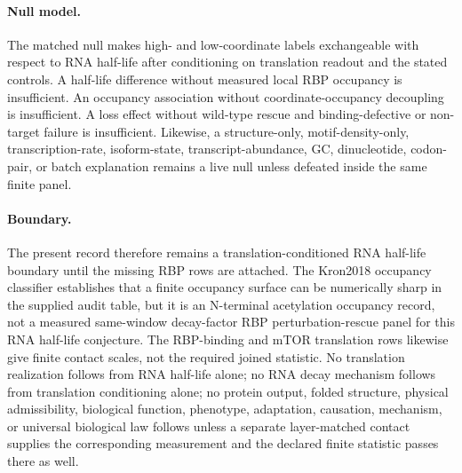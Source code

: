\paragraph{Null model.}
The matched null makes high- and low-coordinate labels exchangeable with respect to RNA half-life after conditioning on translation readout and the stated controls.  A half-life difference without measured local RBP occupancy is insufficient.  An occupancy association without coordinate-occupancy decoupling is insufficient.  A loss effect without wild-type rescue and binding-defective or non-target failure is insufficient.  Likewise, a structure-only, motif-density-only, transcription-rate, isoform-state, transcript-abundance, GC, dinucleotide, codon-pair, or batch explanation remains a live null unless defeated inside the same finite panel.

\paragraph{Boundary.}
The present record therefore remains a translation-conditioned RNA half-life boundary until the missing RBP rows are attached.  The Kron2018 occupancy classifier establishes that a finite occupancy surface can be numerically sharp in the supplied audit table, but it is an N-terminal acetylation occupancy record, not a measured same-window decay-factor RBP perturbation-rescue panel for this RNA half-life conjecture.  The RBP-binding and mTOR translation rows likewise give finite contact scales, not the required joined statistic.  No translation realization follows from RNA half-life alone; no RNA decay mechanism follows from translation conditioning alone; no protein output, folded structure, physical admissibility, biological function, phenotype, adaptation, causation, mechanism, or universal biological law follows unless a separate layer-matched contact supplies the corresponding measurement and the declared finite statistic passes there as well.